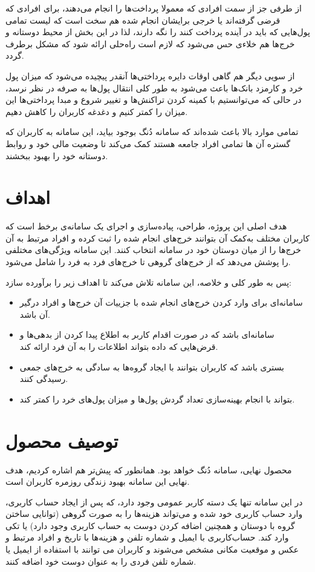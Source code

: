 از طرفی جز از سمت افرادی که معمولا پرداخت‌ها را انجام می‌دهند، برای افرادی که قرضی گرفته‌اند یا خرجی برایشان انجام شده هم سخت است که لیست تمامی پول‌هایی که باید در آینده پرداخت کنند را نگه‌ دارند، لذا در این بخش از محیط دوستانه و خرج‌ها هم خلاءی حس می‌شود که لازم است راه‌حلی ارائه شود که مشکل برطرف گردد.

از سویی دیگر هم گاهی اوقات دایره پرداختی‌ها آنقدر پیچیده می‌شود که میزان پول خرد و کارمزد بانک‌ها باعث می‌شود به طور کلی انتقال پول‌ها به صرفه در نظر نرسد، در حالی که می‌توانستیم با کمینه کردن تراکنش‌ها و تغییر شروع و مبدا پرداختی‌ها این میزان را کمتر کنیم و دغدغه کاربران را کاهش دهیم.

تمامی موارد بالا باعث شده‌اند که سامانه دُنگ بوجود بیاید، این سامانه به کاربران که گستره آن ها تمامی افراد جامعه هستند کمک می‌کند تا وضعیت مالی خود و روابط دوستانه خود را بهبود ببخشند.


\section{اهداف}
هدف اصلی این پروژه، طراحی، پیاده‌سازی و اجرای یک سامانه‌ی برخط است که کاربران مختلف به‌کمک آن بتوانند خرج‌های انجام شده را ثبت کرده و افراد مرتبط به آن‌ خرج‌ها را از میان دوستان خود در سامانه انتخاب کنند. این سامانه ویژگی‌های مختلفی را پوشش می‌دهد که از خرج‌های گروهی تا خرج‌های فرد به فرد را شامل می‌شود.

پس به طور کلی و خلاصه، این سامانه تلاش می‌کند تا اهداف زیر را برآورده سازد:
\begin{itemize}
	\item
	سامانه‌ای برای وارد کردن خرج‌های انجام شده با جزییات آن خرج‌ها و افراد درگیر آن باشد.
	\item 
	سامانه‌ای باشد که در صورت اقدام کاربر به اطلاع پیدا کردن از بدهی‌ها و قرض‌هایی که داده بتواند اطلاعات را به آن فرد ارائه کند.
	\item 
	بستری باشد که کاربران بتوانند با ایجاد گروه‌ها به سادگی به خرج‌های جمعی رسیدگی کنند.
	\item
	بتواند با انجام بهینه‌سازی تعداد گردش پول‌ها و میزان پول‌های خرد را کمتر کند.
\end{itemize}

\section{توصیف محصول}
محصول نهایی، سامانه دُنگ خواهد بود. همانطور که پیش‌تر هم اشاره کردیم، هدف نهایی این سامانه بهبود زندگی روزمره کاربران است.

در این سامانه تنها یک دسته کاربر عمومی وجود دارد، که پس از ایجاد حساب کاربری، وارد حساب کاربری خود شده و می‌تواند هزینه‌ها را به صورت گروهی (توانایی ساختن گروه با دوستان و همچنین اضافه کردن دوست به حساب کاربری وجود دارد) یا تکی وارد کند. حساب‌کاربری با ایمیل و شماره تلفن و هزینه‌ها با تاریخ و افراد مرتبط و عکس و موقعیت مکانی مشخص می‌شوند و کاربران می توانند با استفاده از ایمیل یا شماره تلفن فردی را به عنوان دوست خود اضافه کنند.

